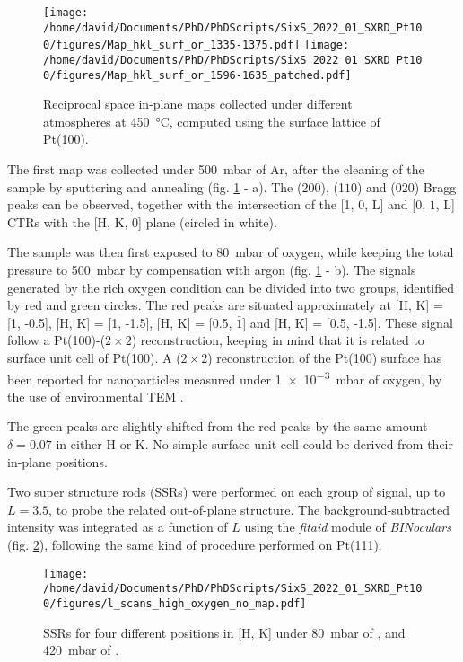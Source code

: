 \begin{figure}[!htb]
    \centering
    \texttt{[image: /home/david/Documents/PhD/PhDScripts/SixS\_2022\_01\_SXRD\_Pt100/figures/Map\_hkl\_surf\_or\_1335-1375.pdf]}
    \texttt{[image: /home/david/Documents/PhD/PhDScripts/SixS\_2022\_01\_SXRD\_Pt100/figures/Map\_hkl\_surf\_or\_1596-1635\_patched.pdf]}
    \caption{
        Reciprocal space in-plane maps collected under different atmospheres at \qty{450}{\degreeCelsius}, computed using the surface lattice of Pt(100).
    }
    \label{fig:MapsPt100A}
\end{figure}

The first map was collected under \qty{500}{\milli\bar} of Ar, after the cleaning of the sample by sputtering and annealing (fig. \ref{fig:MapsPt100A} - a).
The (200), (1$\bar{1}$0) and (0$\bar{2}$0) Bragg peaks can be observed, together with the intersection of the [1, 0, L] and [0, $\bar{1}$, L] CTRs with the [H, K, 0] plane (circled in white).

The sample was then first exposed to \qty{80}{\milli\bar} of oxygen, while keeping the total pressure to \qty{500}{\milli\bar} by compensation with argon (fig. \ref{fig:MapsPt100A} - b).
The signals generated by the rich oxygen condition can be divided into two groups, identified by red and green circles.
The red peaks are situated approximately at [H, K] = [1, -0.5], [H, K] = [1, -1.5], [H, K] = [0.5, $\bar{1}$] and [H, K] = [0.5, -1.5].
These signal follow a Pt(100)-($2\times2$) reconstruction, keeping in mind that it is related to surface unit cell of Pt(100).
A ($2\times2$) reconstruction of the Pt(100) surface has been reported for nanoparticles measured under \qty{1e-3}{\milli\bar} of oxygen, by the use of environmental TEM \parencite{Li2016}.

The green peaks are slightly shifted from the red peaks by the same amount $\delta = 0.07$ in either H or K.
No simple surface unit cell could be derived from their in-plane positions.

Two super structure rods (SSRs) were performed on each group of signal, up to $L=3.5$, to probe the related out-of-plane structure.
The background-subtracted intensity was integrated as a function of $L$ using the \textit{fitaid} module of \textit{BINoculars} (fig. \ref{fig:LScansHighOxygenPt100}), following the same kind of procedure performed on Pt(111).

\begin{figure}[!htb]
    \centering
    \texttt{[image: /home/david/Documents/PhD/PhDScripts/SixS\_2022\_01\_SXRD\_Pt100/figures/l\_scans\_high\_oxygen\_no\_map.pdf]}
    \caption{
        SSRs for four different positions in [H, K] under \qty{80}{\milli\bar} of , and \qty{420}{\milli\bar} of .
    }
    \label{fig:LScansHighOxygenPt100}
\end{figure}

